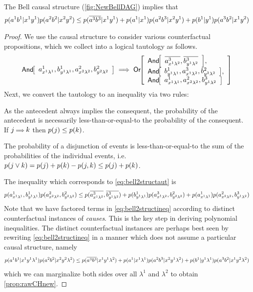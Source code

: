 \begin{prop}\label{prop:rawCHnew}
The Bell causal structure (\cref{fig:NewBellDAG}) implies that
\begin{align*}
p\lparen a^1 b^1|x^1 y^1\rparen p\lparen a^2 b^2|x^2 y^2\rparen
\leq
{
p\lparen\ensuremath{\overline{a^3}} \ensuremath{\overline{b^3}}|x^1 y^1\rparen
+p\lparen a^1|x^1\rparen p\lparen a^2 b^3|x^2 y^1\rparen
+p\lparen b^1|y^1\rparen p\lparen a^3 b^2|x^1 y^2\rparen
}
\end{align*}
\end{prop}
\begin{proof}
We use the causal structure to consider various counterfactual propositions, which we collect into a logical tautology as follows.
\begin{align}\label{eq:bell2structaut}
\NamedFunction{And}{ a^1_{x^1 \lambda ^1} , b^1_{y^1 \lambda ^1} , a^2_{x^2 \lambda ^2} , b^2_{y^2 \lambda ^2} }
\implies 
\NamedFunction{Or}{
    \NamedFunction{And}{ \n{a^3_{x^1 \lambda ^2}} , \n{b^3_{y^1 \lambda ^2}} } ,\\
    \NamedFunction{And}{ b^1_{y^1 \lambda ^1} , a^3_{x^1 \lambda ^2} , b^2_{y^2 \lambda ^2} } ,\\
    \NamedFunction{And}{ a^1_{x^1 \lambda ^1} , a^2_{x^2 \lambda ^2} , b^3_{y^1 \lambda ^2} }
}
\end{align}
Next, we convert the tautology to an inequality via two rules:
\begin{compactenum}
\item As the antecedent always implies the consequent, the probability of the antecedent is necessarily less-than-or-equal-to the probability of the consequent. If $j \mathord{\scriptstyle \implies} k$ then $p\lparen j\rparen\leq p\lparen k\rparen$.
\item The probability of a disjunction of events is less-than-or-equal-to the sum of the probabilities of the individual events, i.e. ${p\lparen j\lor k\rparen=p\lparen j\rparen+p\lparen k\rparen-p\lparen j,k\rparen\leq p\lparen j\rparen+p\lparen k\rparen}$.
\end{compactenum}
The inequality which corresponds to \cref{eq:bell2structaut} is
\begin{align}\label{eq:bell2structineq}
p\lparen a^1_{x^1 \lambda ^1} , b^1_{y^1 \lambda ^1}\rparen p\lparen a^2_{x^2 \lambda ^2} , b^2_{y^2 \lambda ^2}\rparen
\leq
{
p\lparen\ensuremath{\overline{a^3_{x^1 \lambda ^2}}} , \ensuremath{\overline{b^3_{y^1 \lambda ^2}}}\rparen
+p\lparen b^1_{y^1 \lambda ^1}\rparen p\lparen a^3_{x^1 \lambda ^2} , b^2_{y^2 \lambda ^2}\rparen
+p\lparen a^1_{x^1 \lambda ^1}\rparen p\lparen a^2_{x^2 \lambda ^2} , b^3_{y^1 \lambda ^2}\rparen
}
\end{align}
Note that we have factored terms in \cref{eq:bell2structineq} according to distinct counterfactual instances of \emph{causes}. This is the key step in deriving polynomial inequalities. The distinct counterfactual instances are perhaps best seen by rewriting \cref{eq:bell2structineq} in a manner which does not assume a particular causal structure, namely
\begin{align}\label{eq:bell2operineq}
p\lparen a^1 b^1|x^1 y^1 \lambda ^1\rparen p\lparen a^2 b^2|x^2 y^2 \lambda ^2\rparen
\leq
{
p\lparen\ensuremath{\overline{a^3}} \ensuremath{\overline{b^3}}|x^1 y^1 \lambda ^2\rparen
+p\lparen a^1|x^1 \lambda ^1\rparen p\lparen a^2 b^3|x^2 y^1 \lambda ^2\rparen
+p\lparen b^1|y^1 \lambda ^1\rparen p\lparen a^3 b^2|x^1 y^2 \lambda ^2\rparen
}
\end{align}
which we can marginalize both sides over all  $\lambda^1$ and $\lambda^2$ to obtain \cref{prop:rawCHnew}.
\end{proof}

